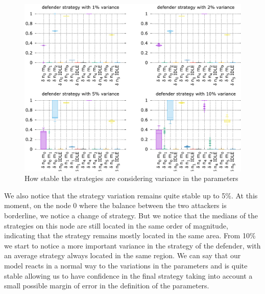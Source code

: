 \begin{figure}[h]
    \centering
    \includegraphics[width=1.0\textwidth]{schema/multiplot.pdf}
    \caption{How stable the strategies are considering variance in the parameters}
    \label{fig:multiplot}
\end{figure}

We also notice that the strategy variation remains quite stable up to 5\%. At this moment, on the node 0 where the balance between the two attackers is borderline, we notice a change of strategy. But we notice that the medians of the strategies on this node are still located in the same order of magnitude, indicating that the strategy remains mostly located in the same area.
From 10\% we start to notice a more important variance in the strategy of the defender, with an average strategy always located in the same region.
We can say that our model reacts in a normal way to the variations in the parameters and is quite stable allowing us to have confidence in the final strategy taking into account a small possible margin of error in the definition of the parameters.
